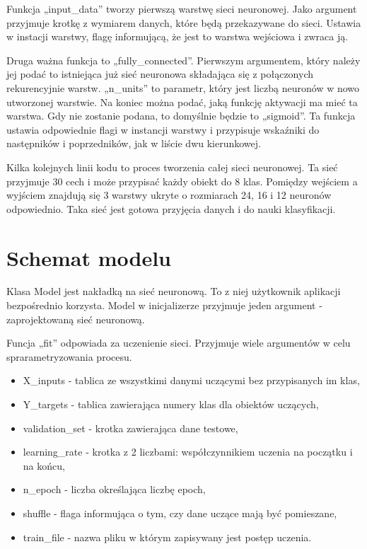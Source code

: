 
    Funkcja „input\_data” tworzy pierwszą warstwę sieci neuronowej.
    Jako argument przyjmuje krotkę z wymiarem danych, które będą przekazywane do sieci.
    Ustawia w instacji warstwy, flagę informującą, że jest to warstwa wejściowa i zwraca ją.

    Druga ważna funkcja to „fully\_connected”.
    Pierwszym argumentem, który należy jej podać to istniejąca już sieć neuronowa składająca się z połączonych rekurencyjnie warstw.
    „n\_units” to parametr, który jest liczbą neuronów w nowo utworzonej warstwie.
    Na koniec można podać, jaką funkcję aktywacji ma mieć ta warstwa.
    Gdy nie zostanie podana, to domyślnie będzie to „sigmoid”.
    Ta funkcja ustawia odpowiednie flagi w instancji warstwy i przypisuje wskaźniki do następników i poprzedników, jak w liście dwu kierunkowej.

    Kilka kolejnych linii kodu to proces tworzenia całej sieci neuronowej.
    Ta sieć przyjmuje 30 cech i może przypisać każdy obiekt do 8 klas.
    Pomiędzy wejściem a wyjściem znajdują się 3 warstwy ukryte o rozmiarach 24, 16 i 12 neuronów odpowiednio.
    Taka sieć jest gotowa przyjęcia danych i do nauki klasyfikacji.

    \section{Schemat modelu}\label{sec:schematModelu}


    Klasa Model jest nakładką na sieć neuronową.
    To z niej użytkownik aplikacji bezpośrednio korzysta.
    Model w inicjalizerze przyjmuje jeden argument - zaprojektowaną sieć neuronową.

    Funcja „fit” odpowiada za uczenienie sieci.
    Przyjmuje wiele argumentów w celu sprarametryzowania procesu.
    \begin{itemize}
        \item X\_inputs - tablica ze wszystkimi danymi uczącymi bez przypisanych im klas,
        \item Y\_targets - tablica zawierająca numery klas dla obiektów uczących,
        \item validation\_set - krotka zawierająca dane testowe,
        \item learning\_rate - krotka z 2 liczbami: współczynnikiem uczenia na początku i na końcu,
        \item n\_epoch - liczba określająca liczbę epoch,
        \item shuffle - flaga informująca o tym, czy dane uczące mają być pomieszane,
        \item train\_file - nazwa pliku w którym zapisywany jest postęp uczenia.
    \end{itemize}

